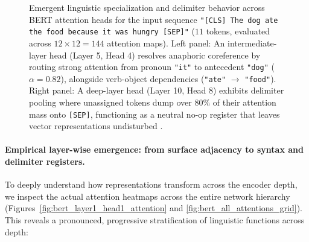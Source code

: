 \documentclass[../../main.tex]{subfiles}
\begin{document}
\begin{figure}[!htbp]
{%
}
\caption{Emergent linguistic specialization and delimiter behavior across BERT attention heads for the input sequence \texttt{"[CLS] The dog ate the food because it was hungry [SEP]"} ($11$ tokens, evaluated across $12 \times 12 = 144$ attention maps). Left panel: An intermediate-layer head (Layer 5, Head 4) resolves anaphoric coreference by routing strong attention from pronoun \texttt{"it"} to antecedent \texttt{"dog"} ($\alpha = 0.82$), alongside verb-object dependencies (\texttt{"ate"} $\to$ \texttt{"food"}). Right panel: A deep-layer head (Layer 10, Head 8) exhibits delimiter pooling where unassigned tokens dump over $80\%$ of their attention mass onto \texttt{[SEP]}, functioning as a neutral no-op register that leaves vector representations undisturbed \cite{clark2019what, michel2019sixteen}.}
\label{fig:bert_attention_maps_specialization}
\end{figure}

\paragraph{Empirical layer-wise emergence: from surface adjacency to syntax and delimiter registers.}
To deeply understand how representations transform across the encoder depth, we inspect the actual attention heatmaps across the entire network hierarchy (Figures~\ref{fig:bert_layer1_head1_attention} and \ref{fig:bert_all_attentions_grid}). This reveals a pronounced, progressive stratification of linguistic functions across depth:
\end{document}
